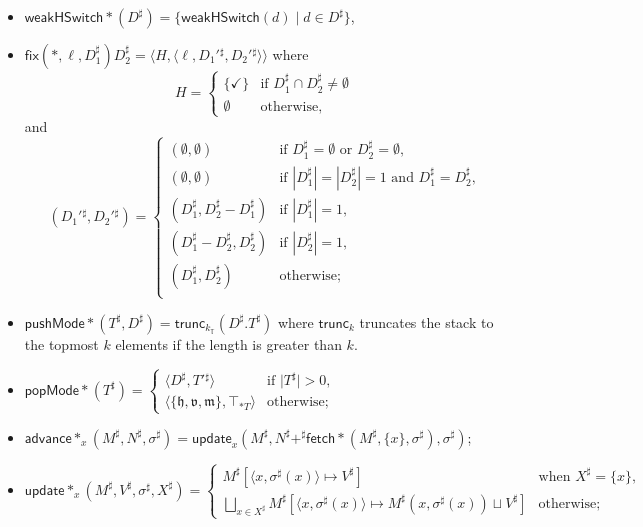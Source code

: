 \documentclass[a4paper]{article}
\newcommand*{\dom}[1]{\mathbb{#1}}
\newcommand*{\mode}[1]{\mathfrak{#1}}
\newcommand*{\weakhsw}{\mathsf{weakHSwitch}}
\newcommand*{\fix}[3]{\mathsf{fix}(#1, #2, #3)}
\newcommand*{\update}{\mathsf{update}}
\newcommand*{\Advance}{\mathsf{advance}}
\newcommand*{\fetch}{\mathsf{fetch}}
\newcommand*{\pushMode}{\mathsf{pushMode}}
\newcommand*{\popMode}{\mathsf{popMode}}
\begin{document}
\begin{itemize}
\item $\weakhsw*(D^\sharp) = \{\weakhsw(d) \mid d \in D^\sharp\}$,
\item $\fix*{\ell}{D_1^\sharp}{D_2^\sharp} = \langle H, \langle \ell, D_1'{}^\sharp, D_2'{}^\sharp\rangle\rangle$
  where \[H =
  \begin{cases}
    \{\checkmark\} & \text{if $D_1^\sharp \cap D_2^\sharp \ne \emptyset$} \\
    \emptyset & \text{otherwise,}
  \end{cases}\] and \[(D_1'{}^\sharp, D_2'{}^\sharp) =
  \begin{cases}
    (\emptyset, \emptyset) & \text{if $D_1^\sharp = \emptyset$ or $D_2^\sharp = \emptyset$,}\\
    (\emptyset, \emptyset) & \text{if $|D_1^\sharp| = |D_2^\sharp| = 1$ and $D_1^\sharp = D_2^\sharp$,}\\
    (D_1^\sharp, D_2^\sharp - D_1^\sharp) & \text{if $|D_1^\sharp| = 1$,}\\
    (D_1^\sharp - D_2^\sharp, D_2^\sharp) & \text{if $|D_2^\sharp| = 1$,}\\
    (D_1^\sharp, D_2^\sharp) & \text{otherwise;}\\
  \end{cases}\]
\item $\pushMode*(T^\sharp, D^\sharp) = \textsf{trunc}_{k_{\dom T}}(D^\sharp.T^\sharp)$ where $\textsf{trunc}_k$ truncates the stack to the topmost $k$ elements if the length is greater than $k$.
\item $\popMode*(T^\sharp) =
  \begin{cases}
    \langle D^\sharp, T'{}^\sharp \rangle & \text{if $\lvert T^\sharp \rvert > 0$,}\\
    \langle \{\mode h, \mode v, \mode m\}, \top_{\dom*T} \rangle & \text{otherwise;}
  \end{cases}$
\item $\Advance*_x(M^\sharp, N^\sharp, \sigma^\sharp) = \update_x(M^\sharp, N^\sharp +^\sharp \fetch*(M^\sharp, \{x\}, \sigma^\sharp), \sigma^\sharp)$;
\item $\update*_x(M^\sharp, V^\sharp, \sigma^\sharp, X^\sharp) =
  \begin{cases}
    M^\sharp[\langle x, \sigma^\sharp(x)\rangle \mapsto V^\sharp] &\text{when $X^\sharp = \{x\}$,}\\
    \bigsqcup_{x \in X^\sharp} M^\sharp[\langle x, \sigma^\sharp(x) \rangle \mapsto M^\sharp(x, \sigma^\sharp(x)) \sqcup V^\sharp] &\text{otherwise;}
  \end{cases}$


\end{itemize}
\end{document}
